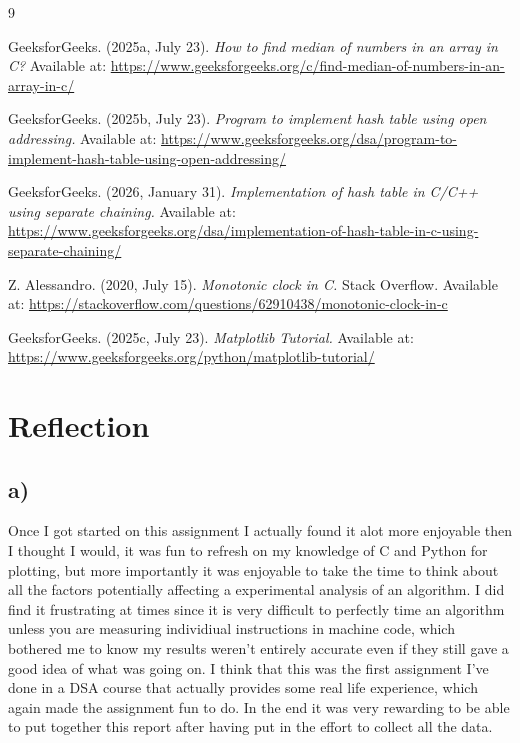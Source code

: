 \documentclass{article}
\begin{document}
\begin{thebibliography}{9}

GeeksforGeeks. (2025a, July 23).
\textit{How to find median of numbers in an array in C?}
Available at: \url{https://www.geeksforgeeks.org/c/find-median-of-numbers-in-an-array-in-c/}

GeeksforGeeks. (2025b, July 23).
\textit{Program to implement hash table using open addressing.}
Available at: \url{https://www.geeksforgeeks.org/dsa/program-to-implement-hash-table-using-open-addressing/}

GeeksforGeeks. (2026, January 31).
\textit{Implementation of hash table in C/C++ using separate chaining.}
Available at: \url{https://www.geeksforgeeks.org/dsa/implementation-of-hash-table-in-c-using-separate-chaining/}

Z. Alessandro. (2020, July 15).
\textit{Monotonic clock in C.}
Stack Overflow.
Available at: \url{https://stackoverflow.com/questions/62910438/monotonic-clock-in-c}

GeeksforGeeks. (2025c, July 23).
\textit{Matplotlib Tutorial.}
Available at: \url{https://www.geeksforgeeks.org/python/matplotlib-tutorial/}

\end{thebibliography}

\newpage
\section*{Reflection}
\subsection*{a)}
Once I got started on this assignment I actually found it alot more enjoyable then I thought I would, it was fun to refresh on my knowledge of C and Python for plotting, but more importantly it was enjoyable to take the time to think about all the factors potentially affecting a experimental analysis of an algorithm. I did find it frustrating at times since it is very difficult to perfectly time an algorithm unless you are measuring individiual instructions in machine code, which bothered me to know my results weren't entirely accurate even if they still gave a good idea of what was going on. I think that this was the first assignment I've done in a DSA course that actually provides some real life experience, which again made the assignment fun to do. In the end it was very rewarding to be able to put together this report after having put in the effort to collect all the data.
\end{document}
